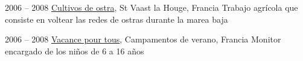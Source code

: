 \item[Ostrícultor]{2006 -- 2008}
	{
	\href{http://huitresdesaintvaast.fr/}{Cultivos de ostra}, St Vaast la Houge, Francia
	}
	{Trabajo agrícola que consiste en voltear las redes de ostras durante la marea baja}


\item[Animador]{2006 -- 2008}
	{
	\href{http://www.vacances-pour-tous.org/}{Vacance pour tous}, Campamentos de verano, Francia
	}
	{Monitor encargado de los niños de 6 a 16 años}
	

